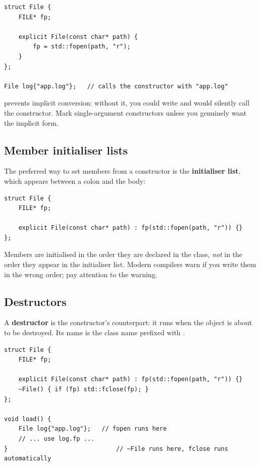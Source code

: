 \begin{lstlisting}
struct File {
    FILE* fp;

    explicit File(const char* path) {
        fp = std::fopen(path, "r");
    }
};

File log{"app.log"};   // calls the constructor with "app.log"
\end{lstlisting}

 prevents implicit conversion: without it, you could
write  and \cpp{} would silently call the
constructor. Mark single-argument constructors  unless
you genuinely want the implicit form.

\subsection{Member initialiser lists}

The preferred way to set members from a constructor is the
\textbf{initialiser list}, which appears between a colon and the
body:

\begin{lstlisting}
struct File {
    FILE* fp;

    explicit File(const char* path) : fp(std::fopen(path, "r")) {}
};
\end{lstlisting}

Members are initialised in the order they are declared in the class,
\emph{not} in the order they appear in the initialiser list. Modern
compilers warn if you write them in the wrong order; pay attention
to the warning.

\subsection{Destructors}

A \textbf{destructor} is the constructor's counterpart: it runs when
the object is about to be destroyed. Its name is the class name
prefixed with \code{\~{}}.

\begin{lstlisting}
struct File {
    FILE* fp;

    explicit File(const char* path) : fp(std::fopen(path, "r")) {}
    ~File() { if (fp) std::fclose(fp); }
};

void load() {
    File log{"app.log"};   // fopen runs here
    // ... use log.fp ...
}                              // ~File runs here, fclose runs automatically
\end{lstlisting}

